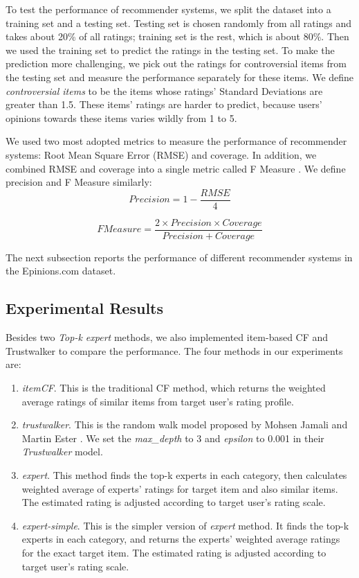 \documentclass[12pt]{article}
\begin{document}
To test the performance of recommender systems, we split the dataset into a training set and a testing set. Testing set is chosen randomly from all ratings and takes about 20\% of all ratings; training set is the rest, which is about 80\%. Then we used the training set to predict the ratings in the testing set. To make the prediction more challenging, we pick out the ratings for controversial items from the testing set and measure the performance separately for these items. We define \emph{controversial items} to be the items whose ratings' Standard Deviations are greater than 1.5. These items' ratings are harder to predict, because users' opinions towards these items varies wildly from 1 to 5. 

We used two most adopted metrics to measure the performance of recommender systems: Root Mean Square Error (RMSE) and coverage. In addition, we combined RMSE and coverage into a single metric called F Measure \cite{Jamali:2009p67}. We define precision and F Measure similarly:
\begin{equation}
Precision = 1 - \frac{RMSE}{4}
\end{equation}

\begin{equation}
F Measure = \frac{2 \times Precision \times Coverage}{Precision + Coverage}
\end{equation}

The next subsection reports the performance of different recommender systems in the Epinions.com dataset. 

\subsection{Experimental Results}
Besides two \emph{Top-k expert} methods, we also implemented item-based CF and Trustwalker to compare the performance. The four methods in our experiments are:

\begin{enumerate}
	\item \emph{itemCF}. This is the traditional CF method, which returns the weighted average ratings of similar items from target user's rating profile. 
	\item \emph{trustwalker}. This is the random walk model proposed by Mohsen Jamali and Martin Ester \cite{Jamali:2009p67}. We set the \emph{max\_depth} to 3 and \emph{epsilon} to 0.001 in their \emph{Trustwalker} model.
	\item \emph{expert}. This method finds the top-k experts in each category, then calculates weighted average of experts' ratings for target item and also similar items. The estimated rating is adjusted according to target user's rating scale. 
	\item \emph{expert-simple}. This is the simpler version of \emph{expert} method. It finds the top-k experts in each category, and returns the experts' weighted average ratings for the exact target item. The estimated rating is adjusted according to target user's rating scale. 
\end{enumerate}
\end{document}

